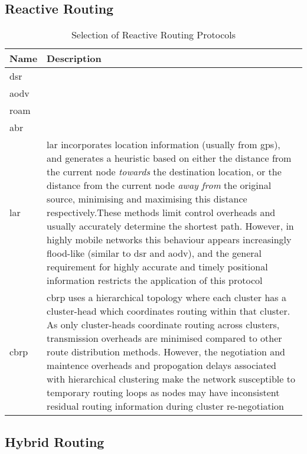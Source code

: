\subsection{Reactive Routing}

\begin{table}\centering
  \caption[Selection of Reactive Routing Protocols]{Selection of Reactive Routing Protocols}
  \label{tab:reactive_routing_protocols}
  \begin{tabularx}{\textwidth}{p{1.25cm}|X}\toprule
    Name & Description \\ \midrule
    \gls{dsr} & \\
    \gls{aodv} & \\
    \gls{roam} & \\
    \gls{abr} & \\
    \gls{lar} & \acrlong{lar} incorporates location information (usually from \gls{gps}), and generates a heuristic based on either the distance from the current node \emph{towards} the destination location, or the distance from the current node \emph{away from} the original source, minimising and maximising this distance respectively.These methods limit control overheads and usually accurately determine the shortest path. However, in highly mobile networks this behaviour appears increasingly flood-like (similar to \gls{dsr} and \gls{aodv}), and the general requirement for highly accurate and timely positional information restricts the application of this protocol\\
    \gls{cbrp} & \acrlong{cbrp} uses a hierarchical topology where each cluster has a cluster-head which coordinates routing within that cluster. As only cluster-heads coordinate routing across clusters, transmission overheads are minimised compared to other route distribution methods. However, the negotiation and maintence overheads and propogation delays associated with hierarchical clustering make the network susceptible to temporary routing loops as nodes may have inconsistent residual routing information during cluster re-negotiation\\
    
    \bottomrule
  \end{tabularx}
\end{table}

\subsection{Hybrid Routing}

